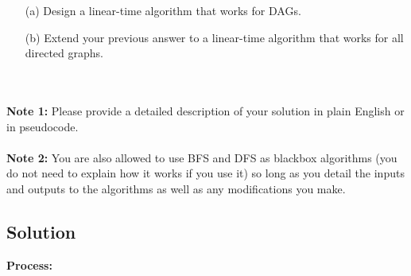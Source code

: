 \documentclass[11pt]{article}
\begin{document}
\begin{enumerate}
    \item[(a)] Design a linear-time algorithm that works for DAGs.
    \item[(b)] Extend your previous answer to a linear-time algorithm that works for all directed graphs.
\end{enumerate}
\\ \\
\textbf{Note 1:} Please provide a detailed description of your solution in plain English or in pseudocode. \\ \\
\textbf{Note 2:} You are also allowed to use BFS and DFS as blackbox algorithms (you do not need to explain how it works if you use it) so long as you detail the inputs and outputs to the algorithms as well as any modifications you make.​

\newpage
\subsection*{Solution}

\textbf{Process:}
\end{document}
